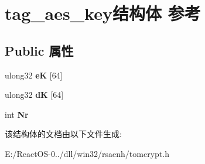 \hypertarget{structtag__aes__key}{}\section{tag\+\_\+aes\+\_\+key结构体 参考}
\label{structtag__aes__key}
\subsection*{Public 属性}
\begin{DoxyCompactItemize}
\item 
\mbox{\label{structtag__aes__key_a7327fa6246ecda2759576344736a2948}} 
ulong32 {\bfseries eK} \mbox{[}64\mbox{]}
\item 
\mbox{\label{structtag__aes__key_a7e7c3c9d144073cb8a24ccc0bdcb6f08}} 
ulong32 {\bfseries dK} \mbox{[}64\mbox{]}
\item 
\mbox{\label{structtag__aes__key_ab1912e92088e6641358653763578cc6d}} 
int {\bfseries Nr}
\end{DoxyCompactItemize}


该结构体的文档由以下文件生成\+:\begin{DoxyCompactItemize}
\item 
E\+:/\+React\+O\+S-\/0../dll/win32/rsaenh/tomcrypt.\+h\end{DoxyCompactItemize}
